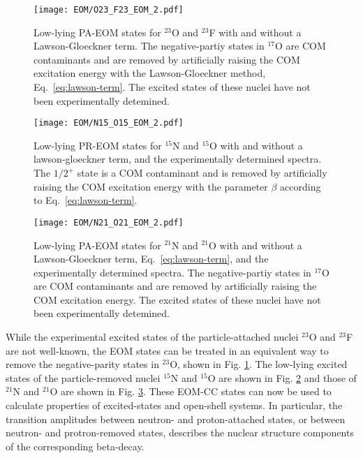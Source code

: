 \documentclass[thesis.tex]{subfiles}
\begin{document}
\begin{figure}
  \texttt{[image: EOM/O23\_F23\_EOM\_2.pdf]}
  \caption{Low-lying PA-EOM states for $^{23}$O and $^{23}$F with and without a Lawson-Gloeckner term.  The negative-partiy states in $^{17}$O are COM contaminants and are removed by artificially raising the COM excitation energy with the Lawson-Gloeckner method, Eq.\ \eqref{eq:lawson-term}.  The excited states of these nuclei have not been experimentally detemined.}
  \label{fig:O23F23_spectra}
\end{figure}

\begin{figure}
  \texttt{[image: EOM/N15\_O15\_EOM\_2.pdf]}
  \caption{Low-lying PR-EOM states for $^{15}$N and $^{15}$O with and without a lawson-gloeckner term, and the experimentally determined spectra.  The $1/2^{+}$ state is a COM contaminant and is removed by artificially raising the COM excitation energy with the parameter $\beta$ according to Eq.\ \eqref{eq:lawson-term}.}
  \label{fig:N15O15_spectra}
\end{figure}

\begin{figure}
  \texttt{[image: EOM/N21\_O21\_EOM\_2.pdf]}
  \caption{Low-lying PA-EOM states for $^{21}$N and $^{21}$O with and without a Lawson-Gloeckner term, Eq.\ \eqref{eq:lawson-term}, and the experimentally determined spectra. The negative-partiy states in $^{17}$O are COM contaminants and are removed by artificially raising the COM excitation energy.  The excited states of these nuclei have not been experimentally detemined.}
  \label{fig:N21O21_spectra}
\end{figure}

While the experimental excited states of the particle-attached nuclei $^{23}$O and $^{23}$F are not well-known, the EOM states can be treated in an equivalent way to remove the negative-parity states in $^{23}$O, shown in Fig. \ref{fig:O23F23_spectra}.  The low-lying excited states of the particle-removed nuclei $^{15}$N and $^{15}$O are shown in Fig. \ref{fig:N15O15_spectra} and those of $^{21}$N and $^{21}$O are shown in Fig. \ref{fig:N21O21_spectra}.  These EOM-CC states can now be used to calculate properties of excited-states and open-shell systems.  In particular, the transition amplitudes between neutron- and proton-attached states, or between neutron- and protron-removed states, describes the nuclear structure components of the corresponding beta-decay.
\end{document}
